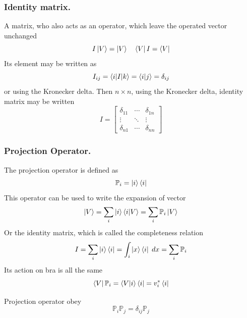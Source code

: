 \documentclass[../../../main.tex]{subfiles}
\begin{document}
\subsubsection{Identity matrix.}
A matrix, who also acts as an operator, which leave the operated vector unchanged
\begin{equation*}
	I \ket{V}=\ket{V}\quad \bra{V}I=\bra{V}
\end{equation*}
Its element may be written as
\begin{equation*}
	I_{ij} =\braket{i|I|k}=\braket{i|j}=\delta_{ij}
\end{equation*}
or using the Kronecker delta.
Then $n\times n$, using the Kronecker delta, identity matrix may be written
\begin{equation*}
	I = \begin{bmatrix}
		\delta_{11} & \cdots & \delta_{1n} \\
		\vdots      & \ddots & \vdots      \\
		\delta_{n1} & \cdots & \delta_{nn}
	\end{bmatrix}
\end{equation*}

\subsubsection{Projection Operator.}
The projection operator is defined as
\begin{equation*}
	\mathbb{P}_i=\ket{i}\bra{i}
\end{equation*}
This operator can be used to write the expansion of vector
\begin{equation*}
	\ket{V}=\sum_i \ket{i}\braket{i|V}=\sum_i \mathbb{P}_i \ket{V}
\end{equation*}
Or the identity matrix, which is called the completeness relation
\begin{equation*}
	{I}=\sum_i \ket{i}\bra{i}=\int_i \ket{x}\bra{i}\;dx=\sum_i \mathbb{P}_i
\end{equation*}
Its action on bra is all the same
\begin{equation*}
	\bra{V}\mathbb{P}_i=\braket{V|i}\bra{i}=v_i^*\bra{i}
\end{equation*}

Projection operator obey
\begin{equation*}
	\mathbb{P}_i\mathbb{P}_j=\delta_{ij}\mathbb{P}_j
\end{equation*}
\end{document}

